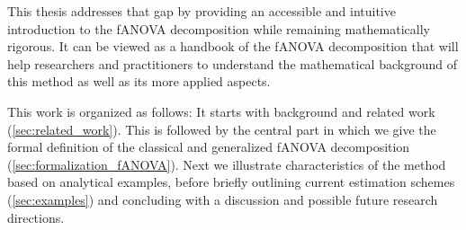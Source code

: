 This thesis addresses that gap by providing an accessible and intuitive introduction to the fANOVA decomposition while remaining mathematically rigorous.
It can be viewed as a handbook of the fANOVA decomposition that will help researchers and practitioners to understand the mathematical background of this method as well as its more applied aspects.\par

This work is organized as follows: It starts with background and related work (\autoref{sec:related_work}). This is followed by the central part in which we give the formal definition of the classical and generalized fANOVA decomposition (\autoref{sec:formalization_fANOVA}).
Next we illustrate characteristics of the method based on analytical examples, before briefly outlining current estimation schemes (\autoref{sec:examples}) and concluding with a discussion and possible future research directions.
